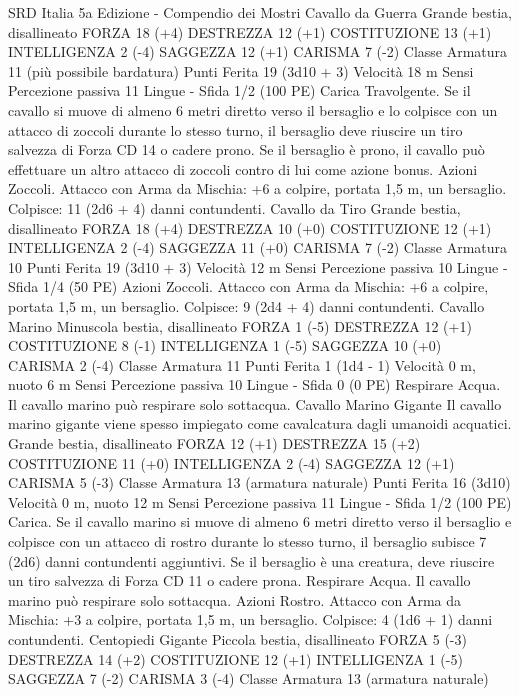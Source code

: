 \begin{multicols}{2}
SRD Italia 5a Edizione - Compendio dei Mostri
Cavallo da Guerra
Grande bestia, disallineato
FORZA 18 (+4)
DESTREZZA 12 (+1)
COSTITUZIONE 13 (+1)
INTELLIGENZA 2 (-4)
SAGGEZZA 12 (+1)
CARISMA 7 (-2)
Classe Armatura 11 (più possibile bardatura)
Punti Ferita 19 (3d10 + 3)
Velocità 18 m
Sensi Percezione passiva 11
Lingue -
Sfida 1/2 (100 PE)
Carica Travolgente. Se il cavallo si muove di almeno 6 metri diretto
verso il bersaglio e lo colpisce con un attacco di zoccoli durante lo
stesso turno, il bersaglio deve riuscire un tiro salvezza di Forza CD
14 o cadere prono. Se il bersaglio è prono, il cavallo può effettuare
un altro attacco di zoccoli contro di lui come azione bonus.
Azioni
Zoccoli. Attacco con Arma da Mischia: +6 a colpire, portata 1,5
m, un bersaglio.
Colpisce: 11 (2d6 + 4) danni contundenti.
Cavallo da Tiro
Grande bestia, disallineato
FORZA 18 (+4)
DESTREZZA 10 (+0)
COSTITUZIONE 12 (+1)
INTELLIGENZA 2 (-4)
SAGGEZZA 11 (+0)
CARISMA 7 (-2)
Classe Armatura 10
Punti Ferita 19 (3d10 + 3)
Velocità 12 m
Sensi Percezione passiva 10
Lingue -
Sfida 1/4 (50 PE)
Azioni
Zoccoli. Attacco con Arma da Mischia: +6 a colpire, portata 1,5
m, un bersaglio.
Colpisce: 9 (2d4 + 4) danni contundenti.
Cavallo Marino
Minuscola bestia, disallineato
FORZA 1 (-5)
DESTREZZA 12 (+1)
COSTITUZIONE 8 (-1)
INTELLIGENZA 1 (-5)
SAGGEZZA 10 (+0)
CARISMA 2 (-4)
Classe Armatura 11
Punti Ferita 1 (1d4 - 1)
Velocità 0 m, nuoto 6 m
Sensi Percezione passiva 10
Lingue -
Sfida 0 (0 PE)
Respirare Acqua. Il cavallo marino può respirare solo sottacqua.
Cavallo Marino Gigante
Il cavallo marino gigante viene spesso impiegato come
cavalcatura dagli umanoidi acquatici.
Grande bestia, disallineato
FORZA 12 (+1)
DESTREZZA 15 (+2)
COSTITUZIONE 11 (+0)
INTELLIGENZA 2 (-4)
SAGGEZZA 12 (+1)
CARISMA 5 (-3)
Classe Armatura 13 (armatura naturale)
Punti Ferita 16 (3d10)
Velocità 0 m, nuoto 12 m
Sensi Percezione passiva 11
Lingue -
Sfida 1/2 (100 PE)
Carica. Se il cavallo marino si muove di almeno 6 metri diretto
verso il bersaglio e colpisce con un attacco di rostro durante lo
stesso turno, il bersaglio subisce 7 (2d6) danni contundenti
aggiuntivi. Se il bersaglio è una creatura, deve riuscire un tiro
salvezza di Forza CD 11 o cadere prona.
Respirare Acqua. Il cavallo marino può respirare solo sottacqua.
Azioni
Rostro. Attacco con Arma da Mischia: +3 a colpire, portata 1,5
m, un bersaglio.
Colpisce: 4 (1d6 + 1) danni contundenti. 
Centopiedi Gigante
Piccola bestia, disallineato
FORZA 5 (-3)
DESTREZZA 14 (+2)
COSTITUZIONE 12 (+1)
INTELLIGENZA 1 (-5)
SAGGEZZA 7 (-2)
CARISMA 3 (-4)
Classe Armatura 13 (armatura naturale)

\end{multicols}
